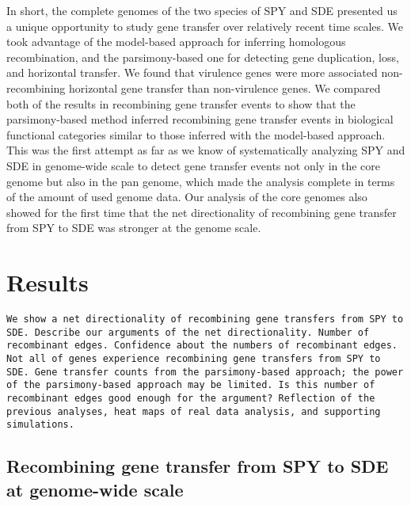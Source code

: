 \documentclass[10pt]{article}
\begin{document}
In short, the complete genomes of the two species of SPY and SDE presented us a
unique opportunity to study gene transfer over relatively recent time scales.
We took advantage of the model-based approach for inferring homologous
recombination, and the parsimony-based one for detecting gene duplication, loss,
and horizontal transfer.  We found that virulence genes were more associated
non-recombining horizontal gene transfer than non-virulence genes.  We compared
both of the results in recombining gene transfer events to show that the
parsimony-based method inferred recombining gene transfer events in biological
functional categories similar to those inferred with the model-based approach.
This was the first attempt as far as we know of systematically analyzing SPY and
SDE in genome-wide scale to detect gene transfer events not only in the core
genome but also in the pan genome, which made the analysis complete in terms of
the amount of used genome data. Our analysis of the core genomes also showed for
the first time that the net directionality of recombining gene transfer from SPY
to SDE was stronger at the genome scale.

\section*{Results}

\texttt{We show a net directionality of recombining gene transfers from SPY to SDE. 
Describe our arguments of the net directionality. 
Number of recombinant edges.
Confidence about the numbers of recombinant edges.
Not all of genes experience recombining gene transfers from SPY to SDE.
Gene transfer counts from the parsimony-based approach; the power of the
parsimony-based approach may be limited.
Is this number of recombinant edges good enough for the argument?
Reflection of the previous analyses, 
heat maps of real data analysis, 
and supporting simulations.}

\subsection*{Recombining gene transfer from SPY to SDE at genome-wide scale}
\end{document}
